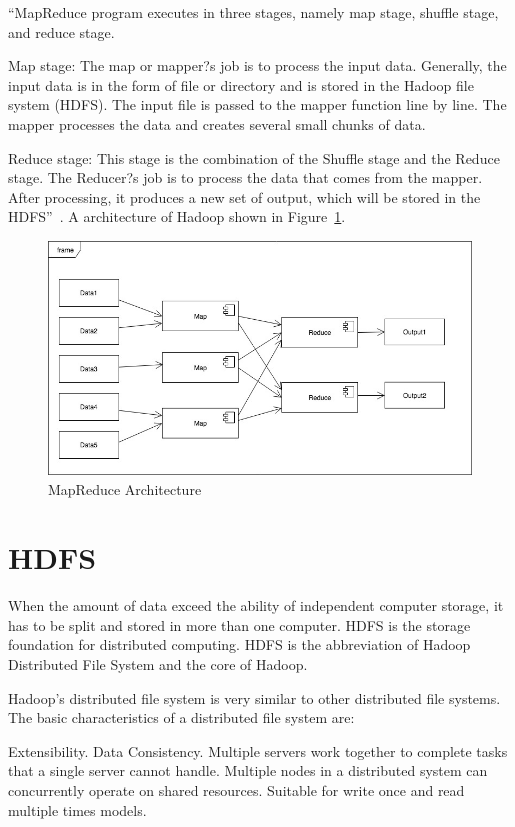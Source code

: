 ``MapReduce program executes in three stages, namely map stage, shuffle stage, 
and reduce stage.

Map stage: The map or mapper?s job is to process the input data. Generally, the 
input data is in the form of file or directory and is stored in the Hadoop file 
system (HDFS). The input file is passed to the mapper function line by line. The 
mapper processes the data and creates several small chunks of data.

Reduce stage: This stage is the combination of the Shuffle stage and the Reduce 
stage. The Reducer?s job is to process the data that comes from the mapper. After 
processing, it produces a new set of output, which will be stored in the HDFS''~\cite{hid-sp18-508-mapreduce}.
A architecture of Hadoop shown in Figure~\ref{f:fly}.

\begin{figure}[!ht]
  \centering\includegraphics[width=\columnwidth]{images/mapReduce.jpg}
  \caption{MapReduce Architecture}\label{f:fly}
\end{figure}

\section{HDFS}
When the amount of data exceed the ability of independent computer storage, it 
has to be split and stored in more than one computer. HDFS is the storage 
foundation for distributed computing. HDFS is the abbreviation of Hadoop 
Distributed File System and the core of Hadoop. 

Hadoop's distributed file system is very similar to other distributed file 
systems. The basic characteristics of a distributed file system are: 

Extensibility.
Data Consistency.
Multiple servers work together to complete tasks that a single server cannot handle.
Multiple nodes in a distributed system can concurrently operate on shared resources.
Suitable for write once and read multiple times models.

